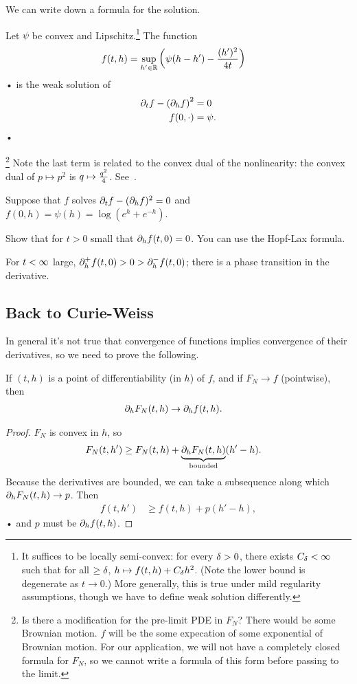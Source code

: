 We can write down a formula for the solution.
\begin{pr}
Let $\psi$ be convex and Lipschitz.\footnote{It suffices to be locally semi-convex: for every $\delta>0$, there exists $C_\delta<\infty$ such that for all $\ge \delta$, $h\mapsto f(t,h) + C_\delta h^2$.
(Note the lower bound is degenerate as $t\to 0$.)
More generally, this is true under mild regularity assumptions, though we have to define weak solution differently.} 
The function
\begin{align*}
f(t,h) &= \sup_{h'\in \mathbb{R}} \left( {\psi(h-h') - \frac{(h')^2}{4t}} \right)
\end{align*}•
is the weak solution of
\begin{align*}
\partial_t f - \left( {\partial_h f} \right)^2 &=0\\
f(0,\cdot)&=\psi.
\end{align*}•
\end{pr}
\footnote{Is there a modification for the pre-limit PDE in $F_N$? There would be some Brownian motion. $f$ will be the some expecation of some exponential of Brownian motion. For our application, we will not have a completely closed formula for $F_N$, so we cannot write a formula of this form before passing to the limit.}
Note the last term is related to the convex dual of the nonlinearity: the convex dual of $p\mapsto p^2$ is $q\mapsto \frac{q^2}{4}$. See~\cite{evans2010partial}.
\begin{exr}
Suppose that $f$ solves $\partial_t f- (\partial_hf)^2=0$ and $f(0,h)=\psi(h) = \log(e^h+e^{-h})$. 

Show that for $t>0$ small that $\partial_h f(t,0) = 0$. You can use the Hopf-Lax formula.

For $t<\infty$ large, $\partial_h^+f(t,0)>0> \partial_h^-f(t,0)$; there is a phase transition in the derivative. %
\end{exr}

\subsection{Back to Curie-Weiss}
In general it's not true that convergence of functions implies convergence of their derivatives, so we need to prove the following.
\begin{pr}
If $(t,h)$ is a point of differentiability (in $h$) of $f$, and if $F_N\to f$ (pointwise), then 
\begin{align*}
\partial_h F_N(t,h) &\to \partial_h f(t,h).
\end{align*}
\end{pr}
\begin{proof}
$F_N$ is convex in $h$, so
\begin{align*}
F_N(t,h') &\ge  F_N(t,h) +\underbrace{\partial_h F_N(t,h)}_{\text{bounded}}(h'-h).
\end{align*}
Because the derivatives are bounded, we can take a subsequence along which $\partial_h F_N(t,h)\to p$.
Then
\begin{align*}
f(t,h') &\ge f(t,h) + p(h'-h), 
\end{align*}•
and $p$ must be $\partial_h f(t,h)$.
\end{proof}
